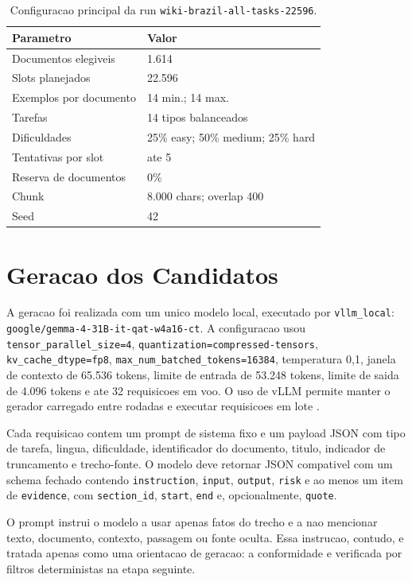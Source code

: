 \documentclass{article}
\newcommand{\runname}{\texttt{wiki-brazil-all-tasks-22596}}
\begin{document}
\begin{table}[t]
\centering
\caption{Configuracao principal da run \runname{}.}
\label{tab:config}
\small
\begin{tabular}{ll}
\toprule
Parametro & Valor \\
\midrule
Documentos elegiveis & 1.614 \\
Slots planejados & 22.596 \\
Exemplos por documento & 14 min.; 14 max. \\
Tarefas & 14 tipos balanceados \\
Dificuldades & 25\% easy; 50\% medium; 25\% hard \\
Tentativas por slot & ate 5 \\
Reserva de documentos & 0\% \\
Chunk & 8.000 chars; overlap 400 \\
Seed & 42 \\
\bottomrule
\end{tabular}
\end{table}

\section{Geracao dos Candidatos}

A geracao foi realizada com um unico modelo local, executado por
\texttt{vllm\_local}: \texttt{google/gemma-4-31B-it-qat-w4a16-ct}. A
configuracao usou \texttt{tensor\_parallel\_size=4},
\texttt{quantization=compressed-tensors}, \texttt{kv\_cache\_dtype=fp8},
\texttt{max\_num\_batched\_tokens=16384}, temperatura 0,1, janela de contexto
de 65.536 tokens, limite de entrada de 53.248 tokens, limite de saida de 4.096
tokens e ate 32 requisicoes em voo. O uso de vLLM permite manter o gerador
carregado entre rodadas e executar requisicoes em lote \citep{kwon2023vllm}.

Cada requisicao contem um prompt de sistema fixo e um payload JSON com tipo de
tarefa, lingua, dificuldade, identificador do documento, titulo, indicador de
truncamento e trecho-fonte. O modelo deve retornar JSON compativel com um
schema fechado contendo \texttt{instruction}, \texttt{input}, \texttt{output},
\texttt{risk} e ao menos um item de \texttt{evidence}, com \texttt{section\_id},
\texttt{start}, \texttt{end} e, opcionalmente, \texttt{quote}.

O prompt instrui o modelo a usar apenas fatos do trecho e a nao mencionar texto,
documento, contexto, passagem ou fonte oculta. Essa instrucao, contudo, e
tratada apenas como uma orientacao de geracao: a conformidade e verificada por
filtros deterministas na etapa seguinte.
\end{document}
